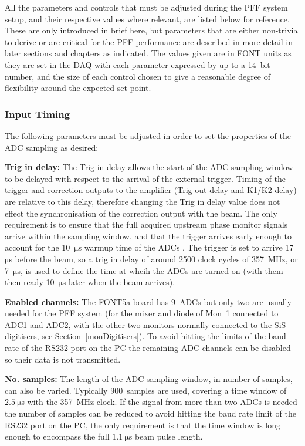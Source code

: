 All the parameters and controls that must be adjusted during the PFF system setup, and their respective values where relevant, are listed below for reference. These are only introduced in brief here, but parameters that are either non-trivial to derive or are critical for the PFF performance are described in more detail in later sections and chapters as indicated. The values given are in FONT units as they are set in the DAQ with each parameter expressed by up to a 14~bit number, and the size of each control chosen to give a reasonable degree of flexibility around the expected set point. 

\subsubsection{Input Timing}

The following parameters must be adjusted in order to set the properties of the ADC sampling as desired:

\textbf{Trig in delay:} The Trig in delay allows the start of the ADC sampling window to be delayed with respect to the arrival of the external trigger. Timing of the trigger and correction outputs to the amplifier (Trig out delay and K1/K2 delay) are relative to this delay, therefore changing the Trig in delay value does not effect the synchronisation of the correction output with the beam. The only requirement is to ensure that the full acquired upstream phase monitor signals arrive within the sampling window, and that the trigger arrives early enough to account for the 10~\(\mathrm{\mu}\)s warmup time of the ADCs \cite{glennPriv}. The trigger is set to arrive 17~\(\mathrm{\mu}\)s before the beam, so a trig in delay of around 2500 clock cycles of 357~MHz, or 7~\(\mathrm{\mu}\)s, is used to define the time at whcih the ADCs are turned on (with them then ready 10~\(\mathrm{\mu}\)s later when the beam arrives).

\textbf{Enabled channels:} The FONT5a board has 9~ADCs but only two are usually needed for the PFF system (for the mixer and diode of Mon~1 connected to ADC1 and ADC2, with the other two monitors normally connected to the SiS digitisers, see Section~\ref{monDigitisers}). To avoid hitting the limits of the baud rate  of the RS232 port on the PC the remaining ADC channels can be disabled so their data is not transmitted.

\textbf{No. samples:} The length of the ADC sampling window, in number of samples, can also be varied. Typically 900~samples are used, covering a time window of \(2.5~\mathrm{\mu}\)s with the 357~MHz clock. If the signal from more than two ADCs is needed the number of samples can be reduced to avoid hitting the baud rate limit of the RS232 port on the PC, the only requirement is that the time window is long enough to encompass the full \(1.1~\mathrm{\mu}\)s beam pulse length.

